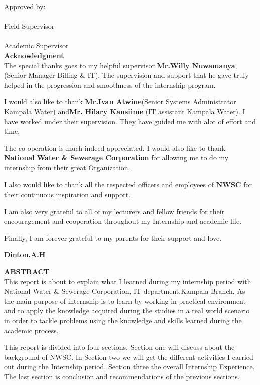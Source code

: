 \documentclass{article}
\begin{document}
Approved by:\\
\makebox[2.5in]{\hrulefill} \hspace{0.3in}\makebox[2.5in]{\dotfill}\\
Field Supervisor \\
\vspace{.1in}
\makebox[2.5in]{\hrulefill} \hspace{0.3in}\makebox[2.5in]{\dotfill}\\
Academic Supervisor \\
\newpage
\textbf{Acknowledgment}\\
The special thanks goes to my helpful supervisor \textbf{Mr.Willy Nuwamanya},(Senior Manager Billing \& IT). The supervision and support that he gave truly helped in the progression and smoothness of the internship program.
\par I would also like to thank \textbf{Mr.Ivan Atwine}(Senior Systems Administrator Kampala Water) and\textbf{Mr. Hilary Kansiime} (IT assistant Kampala Water). I have worked under their supervision. They have guided me with alot of effort and time.
\par The co-operation is much indeed appreciated. I would also like to thank \textbf{National Water \& Sewerage Corporation} for allowing me to do my internship from their great Organization.
\par I also would like to thank all the respected officers and employees of \textbf{NWSC} for their continuous inspiration and support.
\par I am also very grateful to all of my lecturers and fellow friends for their encouragement and cooperation throughout my Internship and academic life.
\par Finally, I am forever grateful to my parents for their support and love.
\begin{flushright}
\textbf{Dinton.A.H}
\end{flushright}
\thispagestyle{empty}
\newpage
\textbf{ABSTRACT}\\
This report is about to explain what I learned during my internship period with National Water \& Sewerage Corporation, IT department,Kampala Branch. As the main purpose of internship is to learn by working in practical environment and to apply the knowledge acquired during the studies in a real world scenario in order to tackle problems using the knowledge and skills learned during the academic process.
\par This report is divided into four  sections. Section one will discuss about the background of NWSC. In Section two we will get the different activities I carried out during the Internship period. Section three the overall Internship Experience. The last section is conclusion and recommendations of the previous sections.
\end{document}

